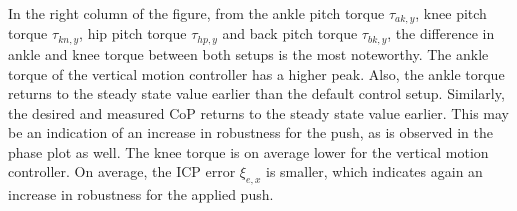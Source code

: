 In the right column of the figure, from the ankle pitch torque $\tau_{ak,y}$, knee pitch torque $\tau_{kn,y}$, hip pitch torque $\tau_{hp,y}$ and back pitch torque $\tau_{bk,y}$, the difference in ankle and knee torque between both setups is the most noteworthy. The ankle torque of the vertical motion controller has a higher peak. Also, the ankle torque returns to the steady state value earlier than the default control setup. Similarly, the desired and measured \ac{CoP} returns to the steady state value earlier. This may be an indication of an increase in robustness for the push, as is observed in the phase plot as well. The knee torque is on average lower for the vertical motion controller. On average, the \ac{ICP} error $\xi_{e,x}$ is smaller, which indicates again an increase in robustness for the applied push.

